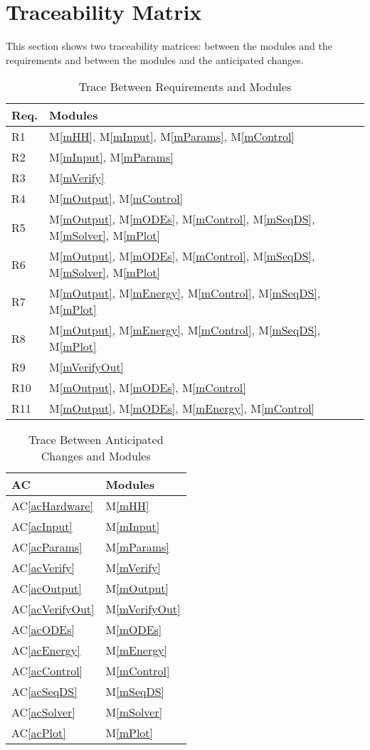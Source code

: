 \documentclass[12pt, titlepage]{article}
\newcommand{\newSection}[1]{
  \newpage
  \section{#1}
}
\newcommand{\acref}[1]{AC\ref{#1}}
\newcommand{\mref}[1]{M\ref{#1}}
\begin{document}
\newSection{Traceability Matrix} \label{SecTM}

This section shows two traceability matrices: between the modules and the
requirements and between the modules and the anticipated changes.

\begin{table}[H]
\centering
\begin{tabular}{p{} p{}}
\toprule
\textbf{Req.} & \textbf{Modules}\\
\midrule
R1 & \mref{mHH}, \mref{mInput}, \mref{mParams}, \mref{mControl}\\
R2 & \mref{mInput}, \mref{mParams}\\
R3 & \mref{mVerify}\\
R4 & \mref{mOutput}, \mref{mControl}\\
R5 & \mref{mOutput}, \mref{mODEs}, \mref{mControl}, \mref{mSeqDS}, \mref{mSolver}, \mref{mPlot}\\
R6 & \mref{mOutput}, \mref{mODEs}, \mref{mControl}, \mref{mSeqDS}, \mref{mSolver}, \mref{mPlot}\\
R7 & \mref{mOutput}, \mref{mEnergy}, \mref{mControl}, \mref{mSeqDS}, \mref{mPlot}\\
R8 & \mref{mOutput}, \mref{mEnergy}, \mref{mControl}, \mref{mSeqDS}, \mref{mPlot}\\
R9 & \mref{mVerifyOut}\\
R10 & \mref{mOutput}, \mref{mODEs}, \mref{mControl}\\
R11 & \mref{mOutput}, \mref{mODEs}, \mref{mEnergy}, \mref{mControl}\\
\bottomrule
\end{tabular}
\caption{Trace Between Requirements and Modules}
\label{TblRT}
\end{table}

\begin{table}[H]
\centering
\begin{tabular}{p{} p{}}
\toprule
\textbf{AC} & \textbf{Modules}\\
\midrule
\acref{acHardware} & \mref{mHH}\\
\acref{acInput} & \mref{mInput}\\
\acref{acParams} & \mref{mParams}\\
\acref{acVerify} & \mref{mVerify}\\
\acref{acOutput} & \mref{mOutput}\\
\acref{acVerifyOut} & \mref{mVerifyOut}\\
\acref{acODEs} & \mref{mODEs}\\
\acref{acEnergy} & \mref{mEnergy}\\
\acref{acControl} & \mref{mControl}\\
\acref{acSeqDS} & \mref{mSeqDS}\\
\acref{acSolver} & \mref{mSolver}\\
\acref{acPlot} & \mref{mPlot}\\
\bottomrule
\end{tabular}
\caption{Trace Between Anticipated Changes and Modules}
\label{TblACT}
\end{table}
\end{document}
